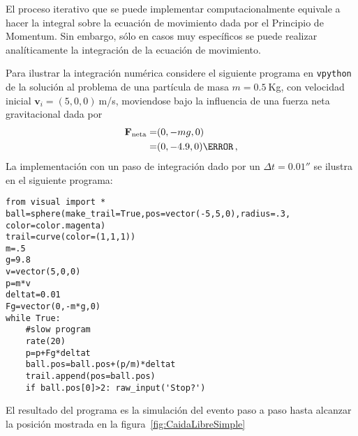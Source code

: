 El proceso iterativo que se puede implementar computacionalmente equivale a hacer la integral sobre la ecuación de movimiento dada por el Principio de Momentum. Sin embargo, sólo en casos muy específicos se puede realizar analíticamente la integración de la ecuación de movimiento.

Para ilustrar la integración numérica considere el siguiente programa en \texttt{vpython} de la solución al problema de una partícula de masa $m=0.5\ $Kg, con velocidad inicial $\mathbf{v}_i=(5,0,0)\ $m/s, moviendose bajo la influencia de una fuerza neta gravitacional dada por
\begin{align}
\textbf{F}_{\text{neta}}=&(0,-mg,0)\nonumber\\
=&(0,-4.9,0)\newton\,,
\end{align}
La implementación con un paso de integración dado por un $\Delta t=0.01\second$ se ilustra en el siguiente programa:

\begin{frame}
\begin{lstlisting}
from visual import *
ball=sphere(make_trail=True,pos=vector(-5,5,0),radius=.3, color=color.magenta)
trail=curve(color=(1,1,1))
m=.5
g=9.8
v=vector(5,0,0)
p=m*v
deltat=0.01
Fg=vector(0,-m*g,0)
while True:
    #slow program
    rate(20)
    p=p+Fg*deltat
    ball.pos=ball.pos+(p/m)*deltat
    trail.append(pos=ball.pos)
    if ball.pos[0]>2: raw_input('Stop?')
\end{lstlisting}
\end{frame}

El resultado del programa es la simulación del evento paso a paso hasta alcanzar la posición mostrada en la figura~\ref{fig:CaidaLibreSimple}


